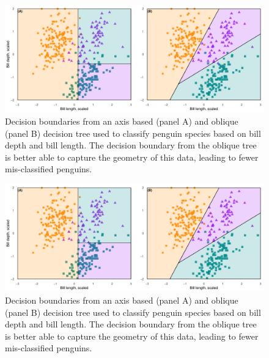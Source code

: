 \documentclass[12pt]{article}\usepackage[]{graphicx}\usepackage[]{xcolor}
\makeatletter
\def\maxwidth{ %
  \ifdim\Gin@nat@width>\linewidth
    \linewidth
  \else
    \Gin@nat@width
  \fi
}
\newenvironment{knitrout}{}{} %
\makeatother
\begin{document}
\begin{knitrout}
\color{fgcolor}\begin{figure}
\includegraphics[width=\maxwidth]{figure/axis_v_oblique-1} \caption[Decision boundaries from an axis based (panel A) and oblique (panel B) decision tree used to classify penguin species based on bill depth and bill length]{Decision boundaries from an axis based (panel A) and oblique (panel B) decision tree used to classify penguin species based on bill depth and bill length. The decision boundary from the oblique tree is better able to capture the geometry of this data, leading to fewer mis-classified penguins.}\label{fig:axis_v_oblique-1}
\end{figure}

\begin{figure}
\includegraphics[width=\maxwidth]{figure/axis_v_oblique-2} \caption[Decision boundaries from an axis based (panel A) and oblique (panel B) decision tree used to classify penguin species based on bill depth and bill length]{Decision boundaries from an axis based (panel A) and oblique (panel B) decision tree used to classify penguin species based on bill depth and bill length. The decision boundary from the oblique tree is better able to capture the geometry of this data, leading to fewer mis-classified penguins.}\label{fig:axis_v_oblique-2}
\end{figure}

\end{knitrout}
\end{document}
